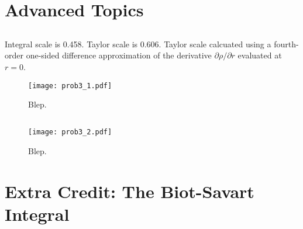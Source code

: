 \documentclass[11pt]{article}
\begin{document}
\section{Advanced Topics}

\subsection{}

Integral scale is 0.458. Taylor scale is 0.606. Taylor scale calcuated using a fourth-order one-sided difference approximation of the derivative $\partial \rho / \partial r$ evaluated at $r=0$.

\begin{figure}[t]
\centering
\texttt{[image: prob3\_1.pdf]}
\\[6pt]
\caption{Blep.}
\label{fig:prob_3_1_autocorrelation}
\end{figure}

\subsection{}

\begin{figure}[t]
\centering
\texttt{[image: prob3\_2.pdf]}
\\[6pt]
\caption{Blep.}
\label{fig:prob_3_2_joint_pdf}
\end{figure}

\section{Extra Credit: The Biot-Savart Integral}

\end{document}
